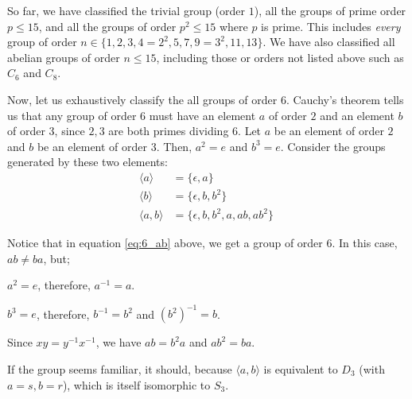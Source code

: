 So far, we have classified the trivial group (order $1$),
all the groups of prime order $p \le 15$,
and all the groups of order $p^2 \le 15$ where $p$ is prime.
This includes \emph{every} group of order
$n \in \{1, 2, 3, 4 = 2^2, 5, 7, 9 = 3^2, 11, 13\}$.
We have also classified all abelian groups of order $n \le 15$,
including those or orders not listed above such as $C_6$ and $C_8$.

Now, let us exhaustively classify the all groups of order $6$.
Cauchy's theorem tells us that any group of order $6$ must have
an element $a$ of order $2$ and an element $b$ of order $3$,
since $2, 3$ are both primes dividing $6$.
Let $a$ be an element of order $2$ and $b$ be an element of order $3$.
Then, $a^2 = e$ and $b^3 = e$.
Consider the groups generated by these two elements:
\begin{align}
  \langle a \rangle & = \{ \epsilon, a \} \\
  \langle b \rangle & = \{ \epsilon, b, b^2 \} \\
  \langle a, b \rangle & = \{ \epsilon, b, b^2, a, ab, ab^2 \}~\label{eq:6_ab}
\end{align}

Notice that in equation \ref{eq:6_ab} above, we get a group of order $6$.
In this case, $ab \ne ba$, but;
\begin{enumalph}
  \item $a^2 = e$, therefore, $a^{-1} = a$.
  \item $b^3 = e$, therefore, $b^{-1} = b^2$ and ${(b^2)}^{-1} = b$.
  \item Since $xy = y^{-1}x^{-1}$, we have $ab = b^2a$ and $ab^2 = ba$.
\end{enumalph}
If the group seems familiar, it should,
because $\langle a, b \rangle$ is
equivalent to $D_3$ (with $a = s, b = r$), which is itself isomorphic to $S_3$.
